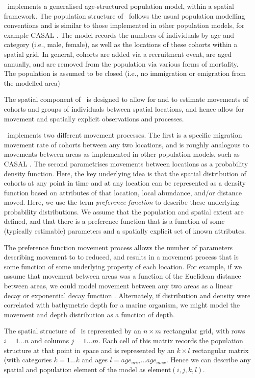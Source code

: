 \SPM\ implements a generalised age-structured population model, within a spatial framework. The population structure of \SPM\ follows the usual population modelling conventions and is similar to those implemented in other population models, for example CASAL \citep{1388}. The model records the numbers of individuals by age and category (i.e., male, female), as well as the locations of these cohorts within a spatial grid. In general, cohorts are added via a recruitment event, are aged annually, and are removed from the population via various forms of mortality. The population is assumed to be closed (i.e., no immigration or emigration from the modelled area)

The spatial component of \SPM\ is designed to allow for and to estimate movements of cohorts and groups of individuals between spatial locations, and hence allow for movement and spatially explicit observations and processes. 

\SPM\ implements two different movement processes. The first is a specific migration movement rate of cohorts between any two locations, and is roughly analogous to movements between areas as implemented in other population models, such as CASAL \citep{1388}. The second parametrises movements between locations as a probability density function. Here, the key underlying idea is that the spatial distribution of cohorts at any point in time and at any location can be represented as a density function based on attributes of that location, local abundance, and/or distance moved. Here, we use the term \emph{preference function} to describe these underlying probability distributions. We assume that the population and spatial extent are defined, and that there is a preference function that is a function of some (typically estimable) parameters and a spatially explicit set of known attributes.

The preference function movement process allows the number of parameters describing movement to to reduced, and results in a movement process that is some function of some underlying property of each location. For example, if we assume that movement between areas was a function of the Euclidean distance between areas, we could model movement between any two areas as a linear decay or exponential decay function \citep{1366}. Alternately, if distribution and density were correlated with bathymetric depth for a marine organism, we might model the movement and depth distribution as a function of depth. 

The spatial structure of \SPM\ is represented by an $n \times m$ rectangular grid, with rows $i=1 \dots n$ and columns $j=1 \ldots m$. Each cell of this matrix records the population structure at that point in space and is represented by an $k \times l$ rectangular matrix (with categories $k=1 \ldots k$ and ages $l=age_{min} \ldots age_{max}$. Hence we can describe any spatial and population element of the model as element$(i,j,k,l)$. 

